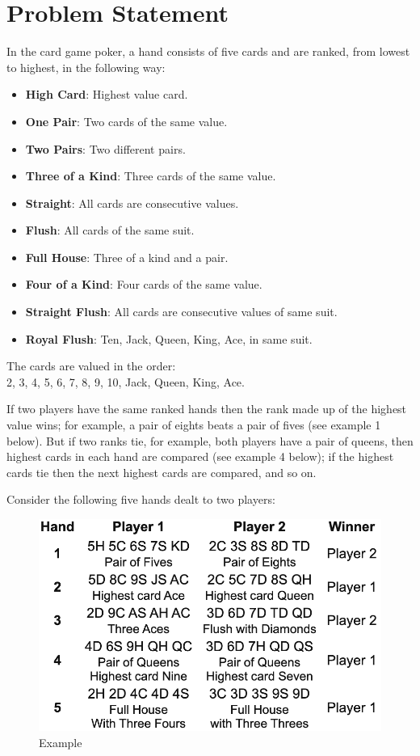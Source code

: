 \documentclass{article}
\begin{document}
    
\section{Problem Statement}

In the card game poker, a hand consists of five cards and are ranked,
from lowest to highest, in the following way:

\begin{itemize}
\item
  \textbf{High Card}: Highest value card.
\item
  \textbf{One Pair}: Two cards of the same value.
\item
  \textbf{Two Pairs}: Two different pairs.
\item
  \textbf{Three of a Kind}: Three cards of the same value.
\item
  \textbf{Straight}: All cards are consecutive values.
\item
  \textbf{Flush}: All cards of the same suit.
\item
  \textbf{Full House}: Three of a kind and a pair.
\item
  \textbf{Four of a Kind}: Four cards of the same value.
\item
  \textbf{Straight Flush}: All cards are consecutive values of same
  suit.
\item
  \textbf{Royal Flush}: Ten, Jack, Queen, King, Ace, in same suit.
\end{itemize}

The cards are valued in the order:\\
2, 3, 4, 5, 6, 7, 8, 9, 10, Jack, Queen, King, Ace.

If two players have the same ranked hands then the rank made up of the
highest value wins; for example, a pair of eights beats a pair of fives
(see example 1 below). But if two ranks tie, for example, both players
have a pair of queens, then highest cards in each hand are compared (see
example 4 below); if the highest cards tie then the next highest cards
are compared, and so on.

Consider the following five hands dealt to two players:

\begin{figure}[H]
  \centering
  \includegraphics[scale=0.75]{../figures/poker.png}
  \caption{Example}
\end{figure}
\end{document}
